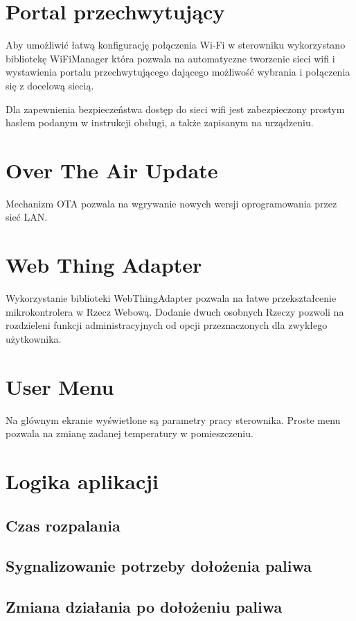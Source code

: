 \documentclass[12pt]{report}
\begin{document}
 \section{Portal przechwytujący}
 Aby umożliwić łatwą konfigurację połączenia Wi-Fi w sterowniku wykorzystano bibliotekę WiFiManager która pozwala na automatyczne tworzenie sieci wifi i wystawienia portalu przechwytującego dającego możliwość wybrania i połączenia się z docelową siecią. 
 
 Dla zapewnienia bezpieczeństwa dostęp do sieci wifi jest zabezpieczony prostym hasłem podanym w instrukcji obsługi, a także zapisanym na urządzeniu.
 
 \section{Over The Air Update}
 Mechanizm OTA pozwala na wgrywanie nowych wersji oprogramowania przez sieć LAN.
 
 \section{Web Thing Adapter}
 Wykorzystanie biblioteki WebThingAdapter pozwala na łatwe przekształcenie mikrokontrolera w Rzecz Webową.
 Dodanie dwuch osobnych Rzeczy pozwoli na rozdzieleni funkcji administracyjnych od opcji przeznaczonych dla zwykłego użytkownika.
 
 \section{User Menu}
 Na głównym ekranie wyświetlone są parametry pracy sterownika.
 Proste menu pozwala na zmianę zadanej temperatury w pomieszczeniu.
 
 \section{Logika aplikacji}
 \subsection{Czas rozpalania}
 \subsection{Sygnalizowanie potrzeby dołożenia paliwa}
 \subsection{Zmiana działania po dołożeniu paliwa}
\end{document}
